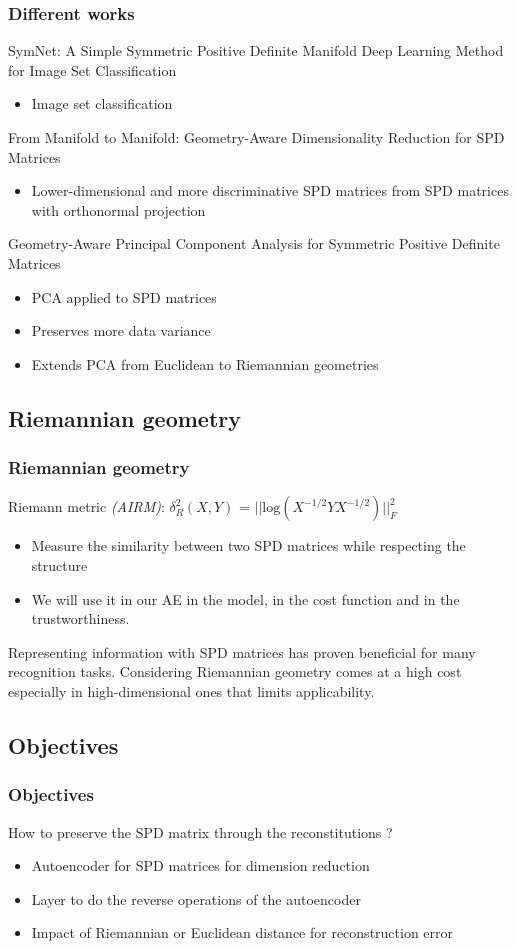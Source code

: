 \documentclass{beamer}
\begin{document}
\begin{frame}
    \frametitle{Different works}
    SymNet: A Simple Symmetric Positive Definite Manifold Deep Learning Method for Image Set Classification \cite{9390301}
    \begin{itemize}
        \item Image set classification
    \end{itemize}
    From Manifold to Manifold: Geometry-Aware Dimensionality Reduction for SPD Matrices \cite{harandi2014manifoldmanifoldgeometryawaredimensionality}
    \begin{itemize}
        \item Lower-dimensional and more discriminative SPD matrices from SPD matrices with orthonormal projection
    \end{itemize}
    Geometry-Aware Principal Component Analysis for Symmetric Positive Definite Matrices \cite{articlepcaaspd}
    \begin{itemize}
        \item PCA applied to SPD matrices
        \item Preserves more data variance
        \item Extends PCA from Euclidean to Riemannian geometries
    \end{itemize}
\end{frame}
\subsection{Riemannian geometry}
\begin{frame}
    \frametitle{Riemannian geometry}
    Riemann metric \textit{(AIRM)}: $\delta^2_R(X,Y)$ = $||\text{log}(X^{-1/2}YX^{-1/2})||^2_F$
    \begin{itemize}
        \item Measure the similarity between two SPD matrices while respecting the structure
        \item We will use it in our AE in the model, in the cost function and in the trustworthiness.
    \end{itemize}
    Representing information with SPD matrices has proven beneficial for many recognition tasks. 
    Considering Riemannian geometry comes at a high cost especially in high-dimensional ones that limits applicability.
\end{frame}
\subsection{Objectives}
\begin{frame}
\frametitle{Objectives}
How to preserve the SPD matrix through the reconstitutions ?
\begin{itemize}
    \item Autoencoder for SPD matrices for dimension reduction
    \item Layer to do the reverse operations of the autoencoder
    \item Impact of Riemannian or Euclidean distance for reconstruction error
\end{itemize}
\end{frame}
\end{document}
